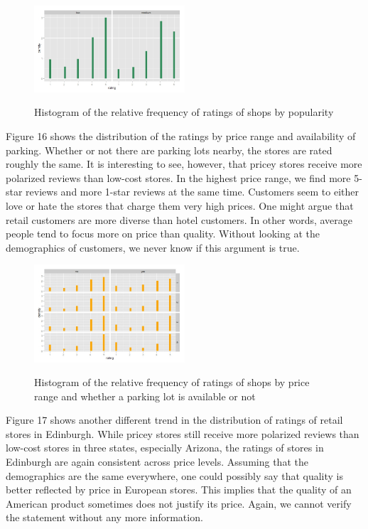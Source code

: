 \documentclass[11pt]{article}
\begin{document}
\begin{figure}[h!]
           \caption{Histogram of the relative frequency of ratings of shops by popularity}
	\centering
	\includegraphics[width=0.5\textwidth]{Figures/shopping1.jpeg}
           \label{shopping1}
\end{figure}

Figure 16 shows the distribution of the ratings by price range and availability of parking. Whether or not there are parking lots nearby, the stores are rated roughly the same. It is interesting to see, however, that pricey stores receive more polarized reviews than low-cost stores. In the highest price range, we find more 5-star reviews and more 1-star reviews at the same time. Customers seem to either love or hate the stores that charge them very high prices. One might argue that retail customers are more diverse than hotel customers. In other words, average people tend to focus more on price than quality. Without looking at the demographics of customers, we never know if this argument is true.

\begin{figure}[h!]
           \caption{Histogram of the relative frequency of ratings of shops by price range and whether a parking lot is available or not}
	\centering
	\includegraphics[width=0.5\textwidth]{Figures/shopping2.jpeg}
           \label{shopping2}
\end{figure}

Figure 17 shows another different trend in the distribution of ratings of retail stores in Edinburgh. While pricey stores still receive more polarized reviews than low-cost stores in three states, especially Arizona, the ratings of stores in Edinburgh are again consistent across price levels. Assuming that the demographics are the same everywhere, one could possibly say that quality is better reflected by price in European stores. This implies that the quality of an American product sometimes does not justify its price. Again, we cannot verify the statement without any more information.
\end{document}
